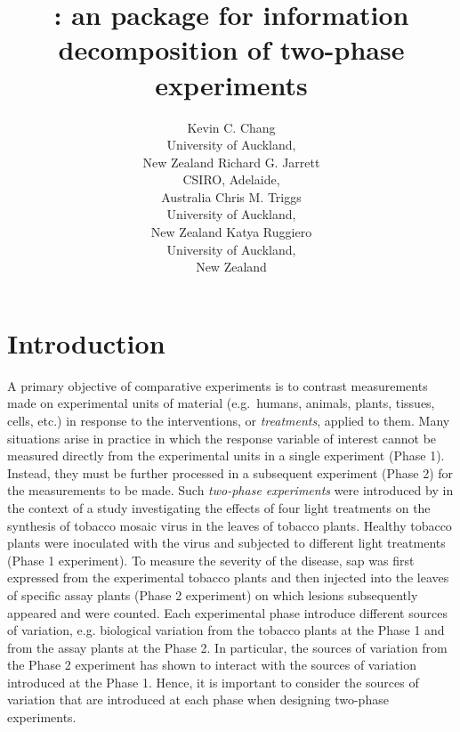 \documentclass[article]{jss}
\author{Kevin C. Chang\\University of Auckland,\\ New Zealand \And
        Richard G. Jarrett\\CSIRO, Adelaide,\\ Australia \And
        Chris M. Triggs\\University of Auckland,\\ New Zealand \And
        Katya Ruggiero\\University of Auckland,\\ New Zealand }
\title{\pkg{InfoDecompuTE}: an \proglang{R} package for information decomposition of two-phase experiments }
\begin{document}
\section[Introduction]{Introduction}
A primary objective of comparative experiments is to contrast measurements made on experimental units of material (e.g.\ humans, animals, plants, tissues, cells, etc.) in response to the interventions, or \emph{treatments}, applied to them. Many situations arise in practice in which the response variable of interest cannot be measured directly from the experimental units in a single experiment (Phase 1). Instead, they must be further processed in a subsequent experiment (Phase 2) for the measurements to be made. Such  \emph{two-phase experiments} were introduced by \cite{McIntyre1955} in the context of a study investigating the effects of four light treatments on the synthesis of tobacco mosaic virus in the leaves of tobacco plants. Healthy tobacco plants were inoculated with the virus and subjected to different light treatments (Phase 1 experiment). To measure the severity of the disease, sap was first expressed from the experimental tobacco plants and then injected into the leaves of specific assay plants (Phase 2 experiment) on which lesions subsequently appeared and were counted. Each experimental phase introduce different sources of variation, e.g. biological variation from the tobacco plants at the Phase 1 and from the assay plants at the Phase 2. In particular, the sources of variation from the Phase 2 experiment has shown to interact with the sources of variation introduced at the Phase 1. Hence, it is important to consider the sources of variation that are introduced at each phase when designing two-phase experiments.
\end{document}
